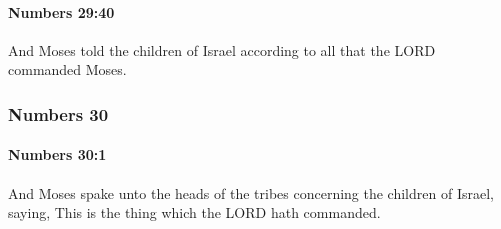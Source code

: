 		\paragraph{Numbers 29:40} %
			\label{NUMBERS-29-40}

			And Moses told the children of Israel according to all that the LORD commanded Moses.

	\subsubsection{Numbers 30} %
		\label{NUMBERS-30}

		\paragraph{Numbers 30:1} %
			\label{NUMBERS-30-1}

			And Moses spake unto the heads of the tribes concerning the children of Israel, saying, This is the thing which the LORD hath commanded.

